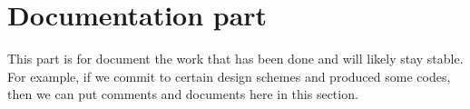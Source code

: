 \documentclass{article}
\begin{document}
% 
\section{Documentation part}
This part is for document the work that has been done and will likely
stay stable.  For example, if we commit to certain design schemes and
produced some codes, then we can put comments and documents here in this
section.
\end{document}
